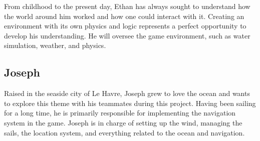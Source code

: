 \documentclass{article}
\begin{document}
From childhood to the present day, Ethan has always sought to understand how the world around him worked and how one could interact with it. Creating an environment with its own physics and logic represents a perfect opportunity to develop his understanding. He will oversee the game environment, such as water simulation, weather, and physics.





\subsection{Joseph}\hfill

Raised in the seaside city of Le Havre, Joseph grew to love the ocean and wants to explore this theme with his teammates during this project. Having been sailing for a long time, he is primarily responsible for implementing the navigation system in the game. Joseph is in charge of setting up the wind, managing the sails, the location system, and everything related to the ocean and navigation.















\newpage
\end{document}
